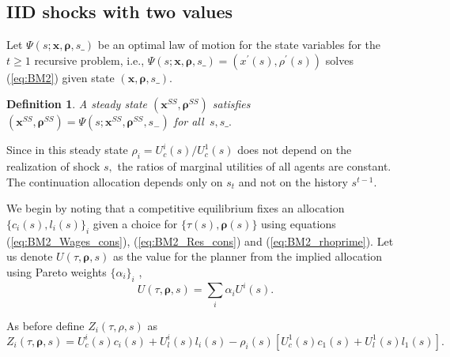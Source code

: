 \documentclass[thmsb,11pt]{article}
\newtheorem{definition}{Definition}
\begin{document}
\subsection{IID shocks with two values}
Let $\Psi \left( s;\bm{x},\bm{\rho },s\_\right) $ be an optimal  law of motion for the state variables
for the $t\geq1$ recursive problem, i.e., $\Psi \left( s;\bm{x},%
\bm{\rho },s\_\right) =\left( x^{\prime }\left( s\right) ,\rho ^{\prime
}\left( s\right) \right) $  solves (\ref{eq:BM2}) given state $\left(
\bm{x},\bm{\rho },s\_\right) .$
\begin{definition}
 A steady state  $\left( \bm{x}^{SS},\bm{\rho} ^{SS}\right) $  satisfies $\left(\bm{ x}^{SS},\bm{\rho}
^{SS}\right) =\Psi \left( s;\bm{x}^{SS},\bm{\rho} ^{SS},s_{-}\right) $ for all $%
\,s,s\_.$
\end{definition}
Since in this steady state $\rho_i =U_{c}^{i}(s)/U_{c}^{1}(s)$ does
not depend on the realization of shock $s,$ the ratios of marginal utilities
of  all agents are constant. The continuation allocation depends only on  $s_{t}$ and not on the  history $s^{t-1}$.%

We  begin by noting that a competitive equilibrium fixes an allocation $\{c_i(s),l_i(s)\}_{i}$ given a choice for $\{\tau(s), \bm{\rho}(s)\}$ using equations (\ref{eq:BM2_Wages_cons}), (\ref{eq:BM2_Res_cons}) and (\ref{eq:BM2_rhoprime}).  Let us denote $U(\tau,\bm{\rho},s)$ as the value for the planner from the implied allocation using Pareto weights $\{\alpha_i\}_i$ ,
\[U(\tau,\bm{\rho},s)=\sum_{i}\alpha_i U^i(s).\]

As before define $Z_i(\tau,\rho,s)$ as
\[Z_i(\tau,\bm \rho,s)=U^i_c(s)c_i(s)+U^i_l(s)l_i(s)-\rho_i(s)\left[U^1_c(s)c_1(s)+U^1_l(s)l_1(s)\right].\]
\end{document}
